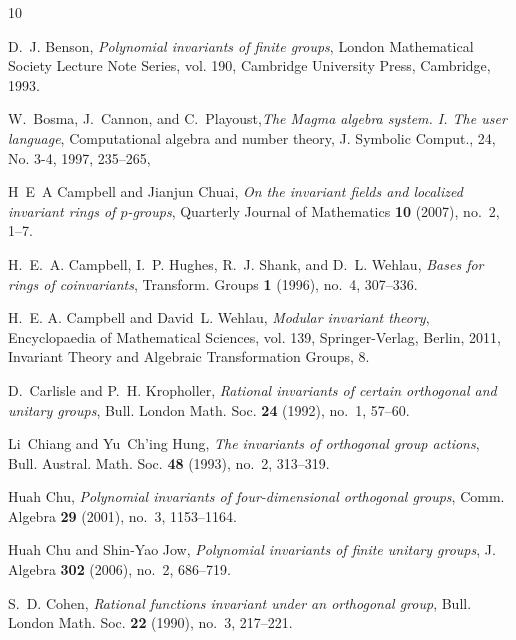 \documentclass{amsart}
\begin{document}
\begin{thebibliography}{10}

D.~J. Benson, \emph{Polynomial invariants of finite groups}, London
  Mathematical Society Lecture Note Series, vol. 190, Cambridge University
  Press, Cambridge, 1993. 

W.~Bosma, J.~Cannon, and C.~Playoust,\emph{The Magma algebra system. I. The user language},
Computational algebra and number theory, J. Symbolic Comput., 24, No. 3-4, 1997, 235--265,

H~E~A Campbell and Jianjun Chuai, \emph{On the invariant fields and localized
  invariant rings of $p$-groups}, Quarterly Journal of Mathematics \textbf{10}
  (2007), no.~2, 1--7. 

H.~E.~A. Campbell, I.~P. Hughes, R.~J. Shank, and D.~L. Wehlau, \emph{Bases for
  rings of coinvariants}, Transform. Groups \textbf{1} (1996), no.~4, 307--336.

H.~E. A. Campbell and David~L. Wehlau, \emph{Modular invariant theory},
  Encyclopaedia of Mathematical Sciences, vol. 139, Springer-Verlag, Berlin,
  2011, Invariant Theory and Algebraic Transformation Groups, 8. 

D.~Carlisle and P.~H. Kropholler, \emph{Rational invariants of certain
  orthogonal and unitary groups}, Bull. London Math. Soc. \textbf{24} (1992),
  no.~1, 57--60. 

Li~Chiang and Yu~Ch'ing Hung, \emph{The invariants of orthogonal group
  actions}, Bull. Austral. Math. Soc. \textbf{48} (1993), no.~2, 313--319.

Huah Chu, \emph{Polynomial invariants of four-dimensional orthogonal groups},
  Comm. Algebra \textbf{29} (2001), no.~3, 1153--1164. 

Huah Chu and Shin-Yao Jow, \emph{Polynomial invariants of finite unitary
  groups}, J. Algebra \textbf{302} (2006), no.~2, 686--719. 

S.~D. Cohen, \emph{Rational functions invariant under an orthogonal group},
  Bull. London Math. Soc. \textbf{22} (1990), no.~3, 217--221. 


\end{thebibliography}
\end{document}
